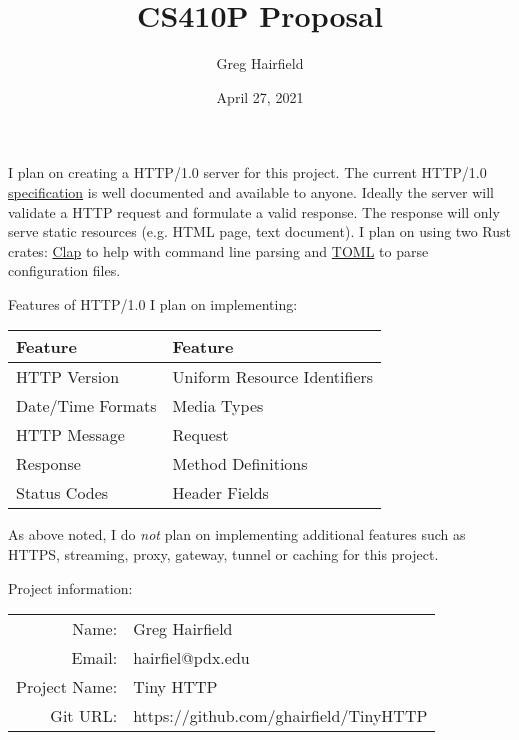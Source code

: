\documentclass[12pt,letterpaper]{extarticle}
\title{CS410P Proposal}
\author{Greg Hairfield}
\date{April 27, 2021}
\begin{document}
\maketitle

I plan on creating a HTTP/1.0 server for this project. The current HTTP/1.0
\href{https://www.ietf.org/rfc/rfc1945.txt}{specification} is well documented
and available to anyone. Ideally the server will validate a HTTP request and 
formulate a valid response. The response will only serve static resources
(e.g. HTML page, text document). I plan on using two Rust crates:
\href{https://clap.rs/}{Clap} to help with command line parsing and 
\href{https://docs.rs/toml/0.5.8/toml/}{TOML} to parse configuration files.

Features of HTTP/1.0 I plan on implementing:

\begin{center}
  \begin{tabular}{ll}
    \hline
    Feature & Feature \\
    \hline\hline
    HTTP Version & Uniform Resource Identifiers \\
    \hline
    Date/Time Formats & Media Types \\
    \hline
    HTTP Message & Request \\
    \hline
    Response & Method Definitions \\
    \hline
    Status Codes & Header Fields \\
    \hline
  \end{tabular}
\end{center}

As above noted, I do \emph{not} plan on implementing additional features such
as HTTPS, streaming, proxy,
gateway, tunnel or caching for this project.

Project information:

\begin{center}
  \begin{tabular}{rl}
    Name: & Greg Hairfield \\
    Email: & hairfiel@pdx.edu \\
    Project Name: & Tiny HTTP \\
    Git URL: & https://github.com/ghairfield/TinyHTTP \\
  \end{tabular}
\end{center}
\end{document}
